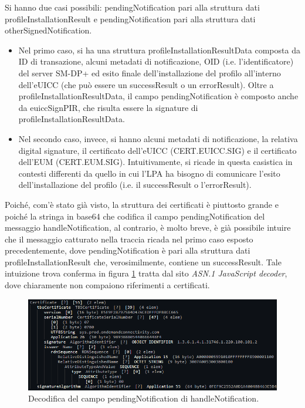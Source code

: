 \documentclass[10pt, oneside]{book}
\begin{document}
Si hanno due casi possibili: pendingNotification pari alla struttura dati profileInstallationResult e pendingNotification pari alla struttura dati otherSignedNotification.
\begin{itemize}
\item Nel primo caso, si ha una struttura profileInstallationResultData composta da ID di transazione, alcuni metadati di notificazione, OID (i.e. l'identificatore) del server SM-DP+ ed esito finale dell'installazione del profilo all'interno dell'eUICC (che può essere un successResult o un errorResult). Oltre a profileInstallationResultData, il campo pendingNotification è composto anche da euiccSignPIR, che risulta essere la signature di profileInstallationResultData.
\item Nel secondo caso, invece, si hanno alcuni metadati di notificazione, la relativa digital signature, il certificato dell'eUICC (CERT.EUICC.SIG) e il certificato dell'EUM (CERT.EUM.SIG). Intuitivamente, si ricade in questa casistica in contesti differenti da quello in cui l'LPA ha bisogno di comunicare l'esito dell'installazione del profilo (i.e. il successResult o l'errorResult).
\end{itemize}
Poiché, com'è stato già visto, la struttura dei certificati è piuttosto grande e poiché la stringa in base64 che codifica il campo pendingNotification del messaggio handleNotification, al contrario, è molto breve, è già possibile intuire che il messaggio catturato nella traccia ricada nel primo caso esposto precedentemente, dove pendingNotification è pari alla struttura dati profileInstallationResult che, verosimilmente, contiene un successResult. Tale intuizione trova conferma in figura \ref{fig:decode-pendingNotification} tratta dal sito \textit{ASN.1 JavaScript decoder}, dove chiaramente non compaiono riferimenti a certificati.
\begin{figure}
\includegraphics[width=\linewidth]{decode-pendingNotification.png}
\caption{Decodifica del campo pendingNotification di handleNotification.}
\label{fig:decode-pendingNotification}
\end{figure}
\end{document}
